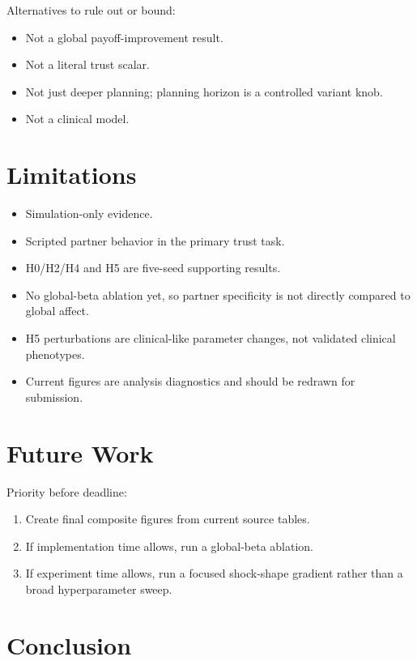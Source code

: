 \documentclass[11pt]{article}
\begin{document}
Alternatives to rule out or bound:
\begin{itemize}
  \item Not a global payoff-improvement result.
  \item Not a literal trust scalar.
  \item Not just deeper planning; planning horizon is a controlled variant knob.
  \item Not a clinical model.
\end{itemize}

\section{Limitations}

\begin{itemize}
  \item Simulation-only evidence.
  \item Scripted partner behavior in the primary trust task.
  \item H0/H2/H4 and H5 are five-seed supporting results.
  \item No global-beta ablation yet, so partner specificity is not directly compared to global affect.
  \item H5 perturbations are clinical-like parameter changes, not validated clinical phenotypes.
  \item Current figures are analysis diagnostics and should be redrawn for submission.
\end{itemize}

\section{Future Work}

Priority before deadline:
\begin{enumerate}
  \item Create final composite figures from current source tables.
  \item If implementation time allows, run a global-beta ablation.
  \item If experiment time allows, run a focused shock-shape gradient rather than a broad hyperparameter sweep.
\end{enumerate}

\section{Conclusion}




\end{document}
